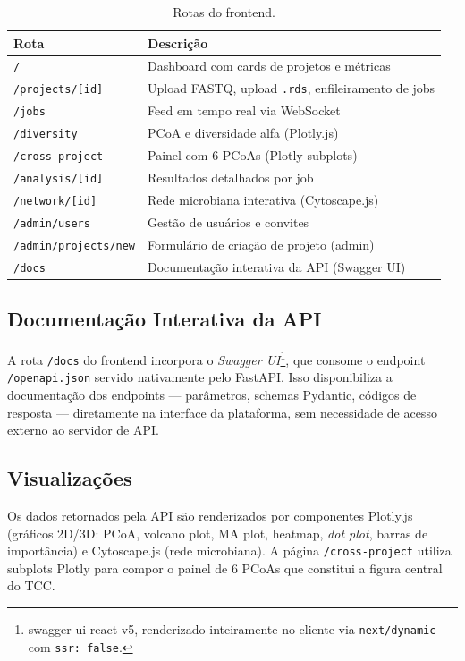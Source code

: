 \begin{table}[H]
\centering
\caption{Rotas do frontend.}
\label{qd:rotas}
\begin{tabularx}{\textwidth}{lX}
\toprule
\textbf{Rota} & \textbf{Descrição} \\
\midrule
\texttt{/}                    & Dashboard com cards de projetos e métricas \\
\texttt{/projects/[id]}       & Upload FASTQ, upload \texttt{.rds}, enfileiramento de jobs \\
\texttt{/jobs}                & Feed em tempo real via WebSocket \\
\texttt{/diversity}           & PCoA e diversidade alfa (Plotly.js) \\
\texttt{/cross-project}       & Painel com 6 PCoAs (Plotly subplots) \\
\texttt{/analysis/[id]}       & Resultados detalhados por job \\
\texttt{/network/[id]}        & Rede microbiana interativa (Cytoscape.js) \\
\texttt{/admin/users}         & Gestão de usuários e convites \\
\texttt{/admin/projects/new}  & Formulário de criação de projeto (admin) \\
\texttt{/docs}                & Documentação interativa da API (Swagger UI) \\
\bottomrule
\end{tabularx}
\end{table}

\subsection{Documentação Interativa da API}

A rota \texttt{/docs} do frontend incorpora o
\textit{Swagger UI}\footnote{swagger-ui-react v5, renderizado inteiramente
no cliente via \texttt{next/dynamic} com \texttt{ssr: false}.},
que consome o endpoint \texttt{/openapi.json} servido nativamente
pelo FastAPI. Isso disponibiliza a documentação dos endpoints —
parâmetros, schemas Pydantic, códigos de resposta — diretamente na
interface da plataforma, sem necessidade de acesso externo ao servidor
de API.

\subsection{Visualizações}

Os dados retornados pela API são renderizados por componentes
Plotly.js (gráficos 2D/3D: PCoA, volcano plot, MA plot, heatmap,
\textit{dot plot}, barras de importância) e Cytoscape.js (rede
microbiana). A página \texttt{/cross-project} utiliza subplots
Plotly para compor o painel de 6 PCoAs que constitui a figura central
do TCC.

